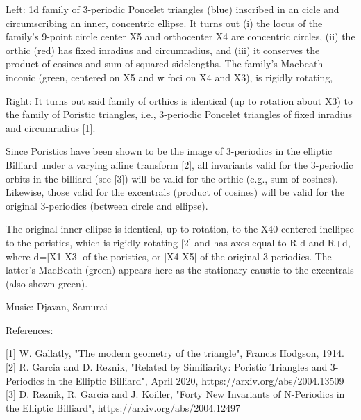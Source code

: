 Left: 1d family of 3-periodic Poncelet triangles (blue) inscribed in an cicle and circumscribing an inner, concentric ellipse. It turns out (i) the locus of the family's 9-point circle center X5 and orthocenter X4 are concentric circles, (ii) the orthic (red) has fixed inradius and circumradius, and (iii) it conserves the product of cosines and sum of squared sidelengths. The family's Macbeath inconic (green, centered on X5 and w foci on X4 and X3), is rigidly rotating,

Right: It turns out said family of orthics is identical (up to rotation about X3) to the family of Poristic triangles, i.e., 3-periodic Poncelet triangles of fixed inradius and circumradius [1]. 

Since Poristics have been shown to be the image of 3-periodics in the elliptic Billiard under a varying affine transform [2], all invariants valid for the 3-periodic orbits in  the billiard (see [3]) will be valid for the orthic (e.g., sum of cosines). Likewise, those valid for the excentrals (product of cosines) will be valid for the original 3-periodics (between circle and ellipse).

The original inner ellipse is identical, up to rotation, to the X40-centered inellipse to the poristics, which is rigidly rotating [2] and has axes equal to R-d and R+d, where d=|X1-X3| of the poristics, or |X4-X5| of the original 3-periodics. The latter's MacBeath (green) appears here as the stationary caustic to the excentrals (also shown green).

Music: Djavan, Samurai

References:

[1] W. Gallatly, "The modern geometry of the triangle", Francis Hodgson, 1914.
[2] R. Garcia and D. Reznik, "Related by Similiarity: Poristic Triangles and 3-Periodics in the Elliptic Billiard", April 2020, https://arxiv.org/abs/2004.13509
[3] D. Reznik, R. Garcia and J. Koiller, "Forty New Invariants of N-Periodics in the Elliptic Billiard", https://arxiv.org/abs/2004.12497